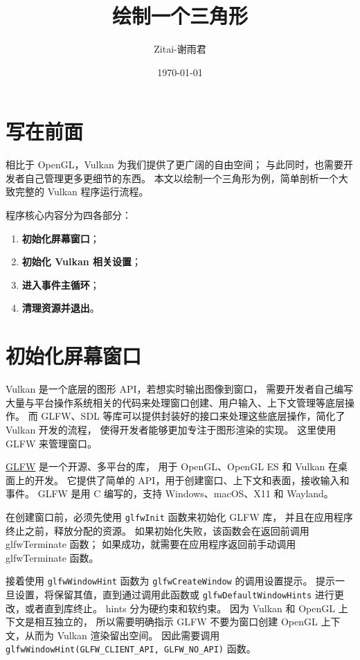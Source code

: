 \documentclass[a4paper, 12pt]{ctexart}
\title{绘制一个三角形}
\author{Zitai-谢雨君}
\date{\today}
\begin{document}
\maketitle

\clearpage
\tableofcontents

\clearpage
\section{写在前面}
    相比于 OpenGL，Vulkan 为我们提供了更广阔的自由空间；
    与此同时，也需要开发者自己管理更多更细节的东西。
    本文以绘制一个三角形为例，简单剖析一个大致完整的 Vulkan 程序运行流程。

    程序核心内容分为四各部分：

    \begin{enumerate}[itemindent=1em, itemsep=0pt, topsep=0pt, parsep=0pt]
        \item \textbf{初始化屏幕窗口}；
        \item \textbf{初始化 Vulkan 相关设置}；
        \item \textbf{进入事件主循环}；
        \item \textbf{清理资源并退出}。
    \end{enumerate}




\clearpage
\section{初始化屏幕窗口}
    Vulkan 是一个底层的图形 API，若想实时输出图像到窗口，
    需要开发者自己编写大量与平台操作系统相关的代码来处理窗口创建、用户输入、上下文管理等底层操作。
    而 GLFW、SDL 等库可以提供封装好的接口来处理这些底层操作，简化了 Vulkan 开发的流程，
    使得开发者能够更加专注于图形渲染的实现。
    这里使用 GLFW 来管理窗口。
    
    \href{https://www.glfw.org/}{GLFW} 是一个开源、多平台的库，
    用于 OpenGL、OpenGL ES 和 Vulkan 在桌面上的开发。
    它提供了简单的 API，用于创建窗口、上下文和表面，接收输入和事件。
    GLFW 是用 C 编写的，支持 Windows、macOS、X11 和 Wayland。

    在创建窗口前，必须先使用 \texttt{glfwInit} 函数来初始化 GLFW 库，
    并且在应用程序终止之前，释放分配的资源。
    如果初始化失败，该函数会在返回前调用 glfwTerminate 函数；
    如果成功，就需要在应用程序返回前手动调用 glfwTerminate 函数。

    接着使用 \texttt{glfwWindowHint} 函数为 \texttt{glfwCreateWindow} 的调用设置提示。
    提示一旦设置，将保留其值，直到通过调用此函数或 \texttt{glfwDefaultWindowHints} 进行更改，或者直到库终止。
    hints 分为硬约束和软约束。
    因为 Vulkan 和 OpenGL 上下文是相互独立的，
    所以需要明确指示 GLFW 不要为窗口创建 OpenGL 上下文，从而为 Vulkan 渲染留出空间。
    因此需要调用 \texttt{glfwWindowHint(GLFW\_CLIENT\_API, GLFW\_NO\_API)} 函数。
    
\end{document}
